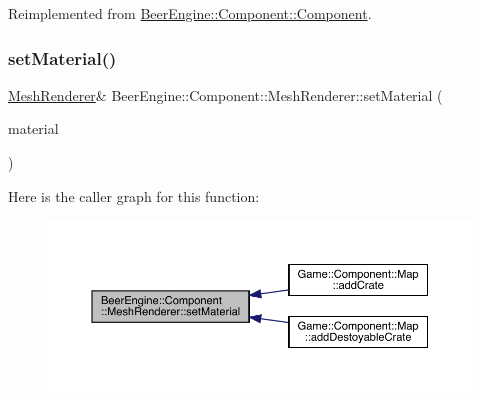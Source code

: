 Reimplemented from \mbox{\hyperlink{class_beer_engine_1_1_component_1_1_component_a4d82d8a6b22b93514e0585fa4073041f}{Beer\+Engine\+::\+Component\+::\+Component}}.

\mbox{\label{class_beer_engine_1_1_component_1_1_mesh_renderer_a9d4408a8c5e670c130394c59eeb5ccf2}} 
\subsubsection{\texorpdfstring{set\+Material()}{setMaterial()}}
{\footnotesize\ttfamily \mbox{\hyperlink{class_beer_engine_1_1_component_1_1_mesh_renderer}{Mesh\+Renderer}}\& Beer\+Engine\+::\+Component\+::\+Mesh\+Renderer\+::set\+Material (\begin{DoxyParamCaption}\item[{\mbox{\hyperlink{class_beer_engine_1_1_graphics_1_1_a_material}{Graphics\+::\+A\+Material}} $\ast$}]{material }\end{DoxyParamCaption})}

Here is the caller graph for this function\+:\nopagebreak
\begin{figure}[H]
\begin{center}
\leavevmode
\includegraphics[width=350pt]{class_beer_engine_1_1_component_1_1_mesh_renderer_a9d4408a8c5e670c130394c59eeb5ccf2_icgraph}
\end{center}
\end{figure}
\mbox{\label{class_beer_engine_1_1_component_1_1_mesh_renderer_a818276a7fe8703a04bf431a41fa4c907}} 
